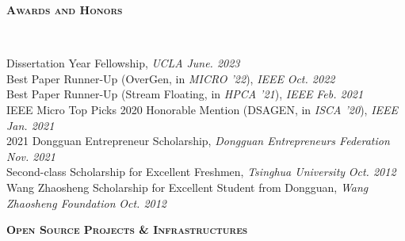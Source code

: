 \documentclass[a4paper]{article}
\newenvironment{changemargin}[2]{%
  \begin{list}{}{%
    \setlength{\topsep}{0pt}%
    \setlength{\leftmargin}{#1}%
    \setlength{\rightmargin}{#2}%
    \setlength{\listparindent}{\parindent}%
    \setlength{\itemindent}{\parindent}%
    \setlength{\parsep}{\parskip}%
  }%
  \item[]}{\end{list}
}
\newcommand{\lineover}{
	\begin{changemargin}{-0.05in}{-0.05in}
		\vspace*{-8pt}
		\hrulefill \\
		\vspace*{-2pt}
	\end{changemargin}
}
\newcommand{\header}[1]{
	\begin{changemargin}{-0.5in}{-0.5in}
		\scshape{\large \textbf{#1}}\\
  	\lineover
	\end{changemargin}
}
\newenvironment{body} {
	\vspace*{-16pt}
	\begin{changemargin}{-0.5in}{-0.5in}
  }	
	{\end{changemargin}
}
\begin{document}

\header{Awards and Honors}

\begin{body}
	\vspace{14pt}
	Dissertation Year Fellowship, \emph{UCLA} \hfill{} \emph{June. 2023}\\
	\smallskip
	Best Paper Runner-Up (OverGen, in \emph{MICRO '22}), \emph{IEEE} \hfill{} \emph{Oct. 2022}\\
	\smallskip
	Best Paper Runner-Up (Stream Floating, in \emph{HPCA '21}), \emph{IEEE} \hfill{} \emph{Feb. 2021}\\
	\smallskip
	IEEE Micro Top Picks 2020 Honorable Mention (DSAGEN, in \emph{ISCA '20}), \emph{IEEE} \hfill{} \emph{Jan. 2021}\\
	\smallskip
	2021 Dongguan Entrepreneur Scholarship, \emph{Dongguan Entrepreneurs Federation} \hfill{} \emph{Nov. 2021}\\
	\smallskip
	Second-class Scholarship for Excellent Freshmen, \emph{Tsinghua University} \hfill{} \emph{Oct. 2012}\\
	\smallskip
	Wang Zhaosheng Scholarship for Excellent Student from Dongguan, \emph{Wang Zhaosheng Foundation} \hfill{} \emph{Oct. 2012}\\
\end{body}

\smallskip
\smallskip

\header{Open Source Projects \& Infrastructures}
\end{document}
